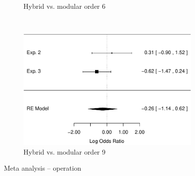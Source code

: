 \documentclass[man,10pt]{apa6}
\begin{document}
\begin{figure}[t]
\begin{subfigure}[c]{0.4\textwidth}
\caption{Hybrid vs. modular order 6}
\end{subfigure}
~
\begin{subfigure}[c]{0.4\textwidth}
\centering
\includegraphics[width=\textwidth]{figures/meta/question_typeoperation_9_conditionhybrid.pdf}
\caption{Hybrid vs. modular order 9}
\end{subfigure}
\caption{Meta analysis -- operation}
\label{meta_op}
\end{figure}\noindent 
\FloatBarrier
\end{document}
